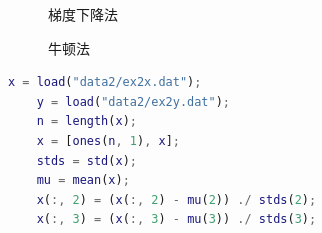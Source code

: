 \documentclass{sdureport}
\begin{document}
\begin{sduDocument}
	\begin{figure}[H]
		\caption{梯度下降法}
	\end{figure}
	\begin{figure}[H]
		\caption{牛顿法}
	\end{figure}

\end{sduDocument}

\sduAppendix %
\begin{lstlisting}[language=matlab]
	x = load("data2/ex2x.dat");
	y = load("data2/ex2y.dat");
	n = length(x);
	x = [ones(n, 1), x];
	stds = std(x);
	mu = mean(x);
	x(:, 2) = (x(:, 2) - mu(2)) ./ stds(2);
	x(:, 3) = (x(:, 3) - mu(3)) ./ stds(3);
\end{lstlisting}
\end{document}
